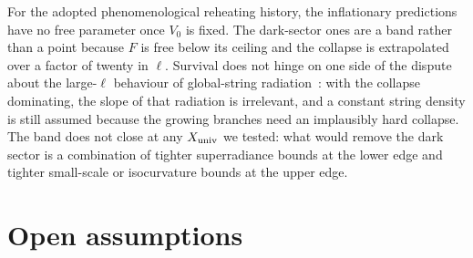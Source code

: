 \documentclass[11pt,a4paper]{article}
\newcommand{\Xu}{X_{\rm univ}}
\begin{document}
\endgroup

For the adopted phenomenological reheating history, the inflationary predictions have no free parameter once $V_0$ is fixed.
The dark-sector ones are a band rather than a point because $F$ is free below its ceiling and the collapse is extrapolated over a factor of twenty in $\ell$.
Survival does not hinge on one side of the dispute about the large-$\ell$ behaviour of global-string radiation~\cite{GHV2021,Buschmann2022,KimParkSon2024,Saikawa2024,Benabou2025,Correia2025spectrum}: with the collapse dominating, the slope of that radiation is irrelevant, and a constant string density is still assumed because the growing branches need an implausibly hard collapse.
The band does not close at any $\Xu$ we tested: what would remove the dark sector is a combination of tighter superradiance bounds at the lower edge and tighter small-scale or isocurvature bounds at the upper edge.

\section{Open assumptions}
\label{sec:open}
\end{document}
